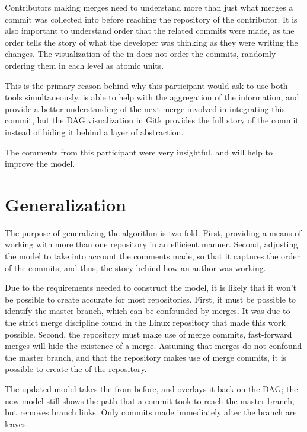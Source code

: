 Contributors making merges need to understand more than just what merges
a commit was collected into before reaching the repository of the
contributor. It is also important to understand order that the related
commits were made, as the order tells the story of what the developer
was thinking as they were writing the changes. The visualization of the
\mt{} in \tool{} does not order the commits, randomly ordering them in
each level as atomic units.

This is the primary reason behind why this participant would ask to use
both tools simultaneously. \tool{} is able to help with the aggregation
of the information, and provide a better understanding of the next merge
involved in integrating this commit, but the DAG visualization in Gitk
provides the full story of the commit instead of hiding it behind a
layer of abstraction.

The comments from this participant were very insightful, and will help
to improve the \mt{} model.

\section{Generalization}\label{sec:generalization}

The purpose of generalizing the algorithm is two-fold. First, providing
a means of working with more than one repository in an efficient manner.
Second, adjusting the model to take into account the comments made, so
that it captures the order of the commits, and thus, the story behind
how an author was working.

Due to the requirements needed to construct the model, it is likely that
it won't be possible to create accurate  for most repositories.
First, it must be possible to identify the master branch, which can be
confounded by \foxtrot{} merges. It was due to the strict merge
discipline found in the Linux repository that made this work possible.
Second, the repository must make use of merge commits, fast-forward
merges will hide the existence of a merge. Assuming that \foxtrot{}
merges do not confound the master branch, and that the repository makes
use of merge commits, it is possible to create the  of the
repository.

The updated model takes the \mt{} from before, and overlays it back on
the DAG; the new model still shows the path that a commit took to reach
the master branch, but removes branch links. Only commits made
immediately after the branch are leaves.

